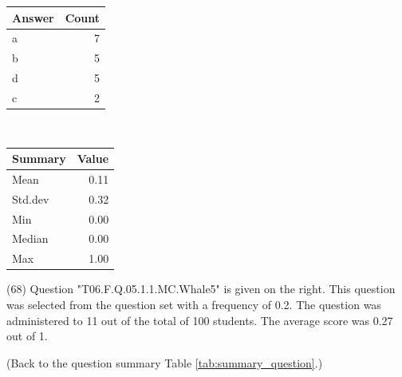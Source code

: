 \documentclass[12pt,nohyper]{tufte-handout}\usepackage[]{graphicx}\usepackage[]{color}
\begin{document}
\begin{center}%
\begin{tabular}{lr}
  \hline
Answer & Count \\ 
  \hline
a &   7 \\ 
  b &   5 \\ 
  d &   5 \\ 
  c &   2 \\ 
   \hline
\end{tabular}
~~~~~~~~%
\begin{tabular}{lr}
  \hline
Summary & Value \\ 
  \hline
Mean & 0.11 \\ 
  Std.dev & 0.32 \\ 
  Min & 0.00 \\ 
  Median & 0.00 \\ 
  Max & 1.00 \\ 
   \hline
\end{tabular}
\end{center}\newpage{} (68) Question "T06.F.Q.05.1.1.MC.Whale5" is given on the right. This question was selected from the question set with a frequency of 0.2. The question was administered to 11 out of the total of 100 students. The average score was 0.27 out of 1.

 (Back to the question summary Table \ref{tab:summary_question}.)
\end{document}
